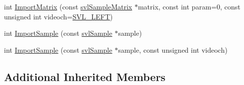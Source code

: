 \begin{DoxyCompactItemize}
\item 
int \hyperlink{classsvl_sample_image_ac46bb5c709df83a50a886b22747314db}{Import\-Matrix} (const \hyperlink{classsvl_sample_matrix}{svl\-Sample\-Matrix} $\ast$matrix, const int param=0, const unsigned int videoch=\hyperlink{svl_definitions_8h_ab9fec7615f19c8df2919eebcab0b187f}{S\-V\-L\-\_\-\-L\-E\-F\-T})
\item 
int \hyperlink{classsvl_sample_image_ab436c7a9201cf26c5035b1c46e5e4f17}{Import\-Sample} (const \hyperlink{classsvl_sample}{svl\-Sample} $\ast$sample)
\item 
int \hyperlink{classsvl_sample_image_a43b4076ff6d5667bf3916ec547f751d9}{Import\-Sample} (const \hyperlink{classsvl_sample}{svl\-Sample} $\ast$sample, const unsigned int videoch)
\end{DoxyCompactItemize}
\subsection*{Additional Inherited Members}


